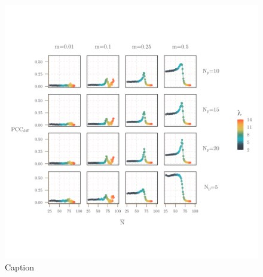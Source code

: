 \documentclass[]{article}
\begin{document}
\begin{figure}[H]
    \centering
    \includegraphics[width=15cm]{figs/abundance_num_pops.png}
 
    \caption{Caption}
    \label{fig:mig_grad}
\end{figure}
\end{document}
